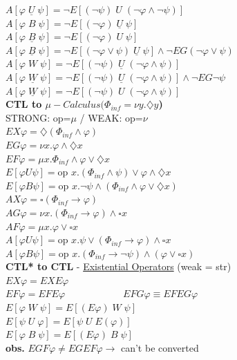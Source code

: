 \documentclass{article}
\begin{document}
\begin{multicols}{4}
$A[\varphi \; \underline{U} \; \psi] =  \neg E[(\neg \psi) \; U\; (\neg \varphi \wedge \neg \psi)]$ \\
$A[\varphi \; B\; \psi]=  \neg E[(\neg \varphi)\; \underline{U} \; \psi] $ \\
$A[\varphi \; \underline{B}\; \psi]=  \neg E[(\neg \varphi)\; U \; \psi] $ \\
$A[\varphi \; \underline{B} \; \psi] =  \neg E[(\neg \varphi \vee \psi) \; \underline{U}\; \psi] \wedge \neg EG(\neg \varphi \vee \psi)$ \\
$A[\varphi \; W\; \psi]=  \neg E[(\neg \psi) \; \underline{U}\; (\neg \varphi \wedge \psi)]$ \\
$A[\varphi \; \underline{W} \; \psi] =  \neg E[(\neg \psi) \; \underline{U}\; (\neg \varphi \wedge \psi)] \wedge \neg EG\neg \psi $ \\
$A[\varphi \; \underline{W} \; \psi] =  \neg E[(\neg \psi) \; U\; (\neg \varphi \wedge \psi)]$\\
\textbf{CTL to $\mu -Calculus (\Phi _{inf} = \nu y.\diamondsuit y$)}\\
STRONG: op=$\mu$ / WEAK: op=$\nu$\\
$EX\varphi = \diamondsuit (\Phi_{inf} \wedge \varphi)$ \\
$EG\varphi = \nu x.\varphi \wedge \diamondsuit x $ \\
$EF\varphi = \mu x.\Phi_{inf} \wedge \varphi \vee \diamondsuit x  $ \\
$E[ \varphi U \psi] = \text{op } x.(\Phi_{inf} \wedge \psi) \vee \varphi \wedge \diamondsuit x $ \\
$E[ \varphi B \psi] = \text{op } x.\neg\psi \wedge (\Phi_{inf} \wedge \varphi \vee \diamondsuit x) $ \\
$AX\varphi = \square (\Phi_{inf} \rightarrow \varphi)$ \\
$AG\varphi = \nu x.(\Phi_{inf} \rightarrow \varphi) \wedge \square x $ \\
$AF\varphi = \mu x.\varphi \vee \square x  $ \\
$A[ \varphi U \psi] = \text{op } x.\psi \vee (\Phi_{inf} \rightarrow \varphi) \wedge \square x $ \\
$A[ \varphi B \psi] = \text{op } x.(\Phi_{inf} \rightarrow \neg\psi) \wedge (\varphi \vee \square x)$\\
\textbf{CTL* to CTL} - \underline{Existential Operators} (weak = str)\\
$EX\varphi = EXE \varphi$\\
$EF\varphi = EFE\varphi\qquad \qquad \qquad EFG\varphi \equiv EFEG\varphi$\\
$E[\varphi\; W \; \psi]=E[(E\varphi)\; W \;\psi]$\\
$E[\psi\; U \; \varphi]=E[\psi \; U \;E(\varphi)]$\\
$E[\varphi\; B \; \psi]=E[(E\varphi)\; B \;\psi]$\\
\textbf{obs.} $EGF\varphi \neq EGEF\varphi \rightarrow$ can't be converted\\ 


\end{multicols}
\end{document}
